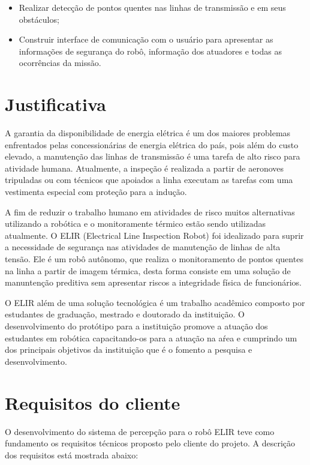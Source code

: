 \begin{itemize}
\item Realizar detecção de pontos quentes nas linhas de transmissão e em seus obstáculos;
\item Construir interface de comunicação com o usuário para apresentar as informações de segurança do robô, informação dos atuadores e todas as ocorrências da missão.
\end{itemize} 




\section{Justificativa}
\label{sec:justi}

A garantia da disponibilidade de energia elétrica é um dos maiores problemas enfrentados pelas concessionárias de energia elétrica do país, pois além do custo elevado, a manutenção das linhas de transmissão é uma tarefa de alto risco para atividade humana. Atualmente, a inspeção é realizada a partir de aeronoves tripuladas ou com técnicos que apoiados a linha executam as tarefas com uma vestimenta especial com proteção para a indução.

A fim de reduzir o trabalho humano em atividades de risco muitos alternativas utilizando a robótica e o monitoramente térmico estão sendo utilizadas atualmente. O ELIR (Electrical Line Inspection Robot) foi idealizado para suprir a necessidade de segurança nas atividades de manutenção de linhas de alta tensão. Ele é um robô autônomo, que realiza o monitoramento de pontos quentes na linha a partir de imagem térmica, desta forma consiste em uma solução de manuntenção preditiva sem apresentar riscos a integridade física de funcionários.

O ELIR além de uma solução tecnológica é um trabalho acadêmico composto por estudantes de graduação, mestrado e doutorado da instituição. O desenvolvimento do protótipo para a instituição promove a atuação dos estudantes em robótica capacitando-os para a atuação na aŕea e cumprindo um dos principais objetivos da instituição que é o fomento a pesquisa e desenvolvimento. 

\section{Requisitos do cliente}
\label{sec:reqc}
O desenvolvimento do sistema de percepção para o robô ELIR teve como fundamento os requisitos técnicos proposto pelo cliente do projeto. A descrição dos requisitos está mostrada abaixo:
